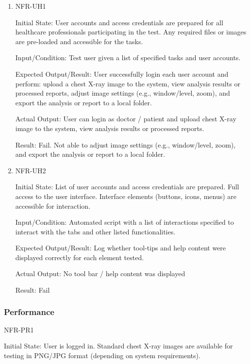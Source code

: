 \documentclass[12pt, titlepage]{article}
\begin{document}
\begin{enumerate}

  \item{NFR-UH1\\}\label{NFR-UH1}
  
  Initial State: User accounts and access credentials are prepared for all healthcare professionals participating in the test. Any required files or images are pre-loaded and accessible for the tasks.
  
  Input/Condition: Test user given a list of specified tasks and user accounts.
  
  Expected Output/Result: User successfully login each user account and perform: upload a chest X-ray image to the system, view analysis results or processed reports, adjust image settings (e.g., window/level, zoom), and export the analysis or report to a local folder.
  
  Actual Output: User can login as doctor / patient and upload chest X-ray image to the system, view analysis results or processed reports.

  Result: Fail. Not able to adjust image settings (e.g., window/level, zoom), and export the analysis or report to a local folder.

\item{NFR-UH2\\}\label{NFR-UH2}

Initial State: List of user accounts and access credentials are prepared. Full access to the user interface. Interface elements (buttons, icons, menus) are accessible for interaction.

Input/Condition: Automated script with a list of interactions specified to interact with the tabs and other listed functionalities.

Expected Output/Result: Log whether tool-tips and help content were displayed correctly for each element tested.

Actual Output: No tool bar / help content was displayed 

Result: Fail

\end{enumerate}

\subsubsection{Performance}
\item{NFR-PR1\\}\label{NFR-PR1}

Initial State: User is logged in. Standard chest X-ray images are available for testing in PNG/JPG format (depending on system requirements).
\end{document}
